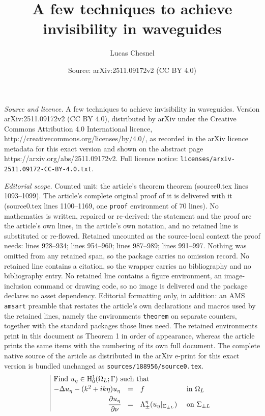 \documentclass[10pt,a4paper]{amsart}
\title{A few techniques to achieve invisibility in waveguides}
\author{Lucas Chesnel}
\date{Source: arXiv:2511.09172v2 (CC BY 4.0)}
\newcommand{\Om}{\Omega}
\newcommand{\mH}{\mrm{H}}
\newcommand{\mrm}[1]{\mathrm{#1}}
\begin{document}
\maketitle

\noindent\emph{Source and licence.} A few techniques to achieve invisibility in waveguides. Version arXiv:2511.09172v2 (CC BY 4.0), distributed by arXiv under the Creative Commons Attribution 4.0 International licence, http://creativecommons.org/licenses/by/4.0/, as recorded in the arXiv licence metadata for this exact version and shown on the abstract page https://arxiv.org/abs/2511.09172v2. Full licence notice: \texttt{licenses/arxiv-2511.09172-CC-BY-4.0.txt}.\par\smallskip

\noindent\textit{Editorial scope.} Counted unit: the article's theorem theorem (source0.tex lines 1093--1099). The article's complete original proof of it is delivered with it (source0.tex lines 1100--1169, one \texttt{proof} environment of 70 lines). No mathematics is written, repaired or re-derived: the statement and the proof are the article's own lines, in the article's own notation, and no retained line is substituted or re-flowed.  Retained uncounted as the source-local context the proof needs: lines 928--934; lines 954--960; lines 987--989; lines 991--997.  Nothing was omitted from any retained span, so the package carries no omission record.  No retained line contains a citation, so the wrapper carries no bibliography and no bibliography entry.  No retained line contains a figure environment, an image-inclusion command or drawing code, so no image is delivered and the package declares no asset dependency.  Editorial formatting only, in addition: an AMS \texttt{amsart} preamble that restates the article's own declarations and macros used by the retained lines, namely the environments \texttt{theorem} on separate counters, together with the standard packages those lines need.  The retained environments print in this document as Theorem 1 in order of appearance, whereas the article prints the same items with the numbering of its own full document.  The complete native source of the article as distributed in the arXiv e-print for this exact version is bundled unchanged as \texttt{sources/188956/source0.tex}.
\begin{equation}\label{WaveguidePbDissipationBounded}
\begin{array}{|rcll}
\multicolumn{4}{|l}{\mbox{Find }u_\eta\in\mH^1_0(\Om_L;\Gamma)\mbox{ such that }}\\[2pt]
-\Delta u_\eta-(k^2+ik\eta)u_\eta&=&f&\mbox{ in }\Om_L \\[2pt]
\cfrac{\partial u_\eta}{\partial \nu} & = & \Lambda_\pm^\eta(u_\eta|_{\Sigma_{\pm L}}) &\mbox{ on }\Sigma_{\pm L}
\end{array}
\end{equation} 
\end{document}
